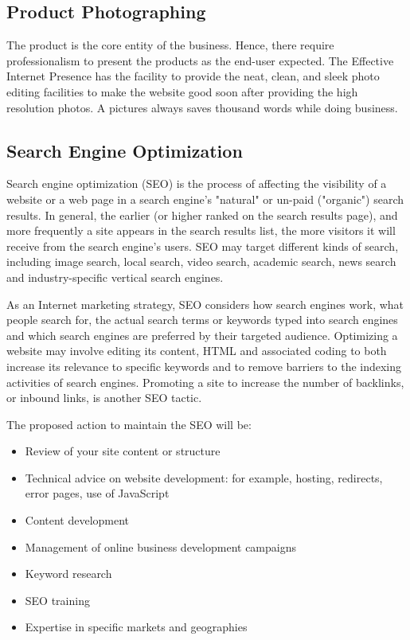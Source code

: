 \documentclass[35pt]{report}
\begin{document}
			\subsection{Product Photographing}
			The product is the core entity of the business. Hence, there require professionalism to present the products as the end-user expected. The Effective Internet Presence has the facility to provide the neat, clean, and sleek photo editing facilities to make the website good soon after providing the high resolution photos. A pictures always saves thousand words while doing business.   

			\subsection{Search Engine Optimization}
			Search engine optimization (SEO) is the process of affecting the visibility of a website or a web page in a search engine's "natural" or un-paid ("organic") search results. In general, the earlier (or higher ranked on the search results page), and more frequently a site appears in the search results list, the more visitors it will receive from the search engine's users. SEO may target different kinds of search, including image search, local search, video search, academic search, news search and industry-specific vertical search engines.


			As an Internet marketing strategy, SEO considers how search engines work, what people search for, the actual search terms or keywords typed into search engines and which search engines are preferred by their targeted audience. Optimizing a website may involve editing its content, HTML and associated coding to both increase its relevance to specific keywords and to remove barriers to the indexing activities of search engines. Promoting a site to increase the number of backlinks, or inbound links, is another SEO tactic.


			The proposed action to maintain the SEO will be:
			\begin{itemize}
				\item Review of your site content or structure
				\item Technical advice on website development: for example, hosting, redirects, error pages, use of JavaScript
				\item Content development
				\item Management of online business development campaigns
				\item Keyword research
				\item SEO training
				\item Expertise in specific markets and geographies
			\end{itemize}
\end{document}
